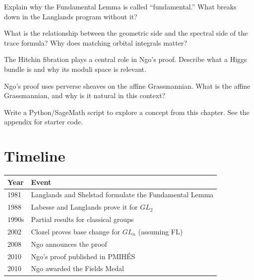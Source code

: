 \begin{exercise}[Basic]
Explain why the Fundamental Lemma is called ``fundamental.'' What breaks down in the Langlands program without it?
\end{exercise}

\begin{exercise}[Intermediate]
What is the relationship between the geometric side and the spectral side of the trace formula? Why does matching orbital integrals matter?
\end{exercise}

\begin{exercise}[Challenge]
The Hitchin fibration plays a central role in Ngo's proof. Describe what a Higgs bundle is and why its moduli space is relevant.
\end{exercise}

\begin{exercise}
Ngo's proof uses perverse sheaves on the affine Grassmannian. What is the affine Grassmannian, and why is it natural in this context?
\end{exercise}


\begin{exercise}[Computational]
Write a Python/SageMath script to explore a concept from this chapter. See the appendix for starter code.
\end{exercise}

\section{Timeline}

\begin{tabularx}{\linewidth}{lX}
\toprule
\textbf{Year} & \textbf{Event} \\ \midrule
1981 & Langlands and Shelstad formulate the Fundamental Lemma \cite{langlands1987} \\ 
1988 & Labesse and Langlands prove it for $GL_2$ \\ 
1990s & Partial results for classical groups \\ 
2002 & Clozel proves base change for $GL_n$ (assuming FL) \\ 
2008 & Ngo announces the proof \cite{ngo2008} \\ 
2010 & Ngo's proof published in PMIH\'ES \cite{ngo2010} \\ 
2010 & Ngo awarded the Fields Medal \\ \bottomrule
\end{tabularx}

